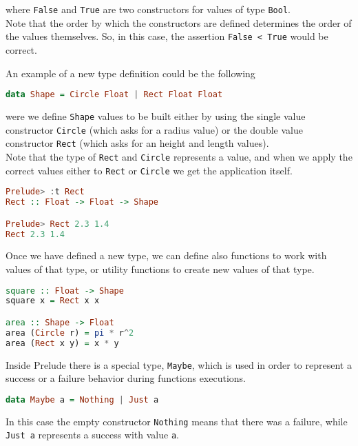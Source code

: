 where \texttt{False} and \texttt{True} are two constructors for values of type \texttt{Bool}. \\
Note that the order by which the constructors are defined determines the order of the values themselves. So, in this case, the assertion \texttt{False < True} would be correct.
\linebreak \linebreak

An example of a new type definition could be the following

\begin{lstlisting}[language=haskell]
data Shape = Circle Float | Rect Float Float
\end{lstlisting}

were we define \texttt{Shape} values to be built either by using the single value constructor \texttt{Circle} (which asks for a radius value) or the double value constructor \texttt{Rect} (which asks for an height and length values). \\
Note that the type of \texttt{Rect} and \texttt{Circle} represents a value, and when we apply the correct values either to \texttt{Rect} or \texttt{Circle} we get the application itself.

\begin{lstlisting}[language=haskell]
Prelude> :t Rect
Rect :: Float -> Float -> Shape

Prelude> Rect 2.3 1.4
Rect 2.3 1.4
\end{lstlisting}

Once we have defined a new type, we can define also functions to work with values of that type, or utility functions to create new values of that type.

\begin{lstlisting}[language=haskell]
square :: Float -> Shape
square x = Rect x x

area :: Shape -> Float
area (Circle r) = pi * r^2
area (Rect x y) = x * y
\end{lstlisting}

Inside Prelude there is a special type, \texttt{Maybe}, which is used in order to represent a success or a failure behavior during functions executions.

\begin{lstlisting}[language=haskell]
data Maybe a = Nothing | Just a
\end{lstlisting}

In this case the empty constructor \texttt{Nothing} means that there was a failure, while \texttt{Just a} represents a success with value \texttt{a}. 


